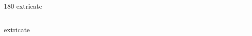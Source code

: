 
\begin{frame}
\begin{center}
\begin{turn}{180}
{\fontsize{2.5cm}{1em}\selectfont extricate}
\end{turn}
\vspace{1em}\par  
\hrule
\vspace{1em}\par  
{\fontsize{2.5cm}{1em}\selectfont extricate}
\end{center}
\end{frame}
